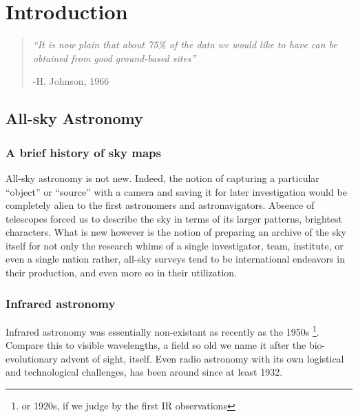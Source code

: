 \chapter{Introduction}
  \label{ch:intro}
  \begin{quotation}
    \small
    \textit{``It is now plain that about 75\% of the data we would like to have can be obtained from good ground-based sites''}

    -H. Johnson, 1966
  \end{quotation}

\section{All-sky Astronomy}

  \subsection{A brief history of sky maps}

    All-sky astronomy is not new. Indeed, the notion of capturing a particular ``object'' or ``source'' with a camera and saving it for later investigation would be completely alien to the first astronomers and astronavigators. Absence of telescopes forced us to describe the sky in terms of its larger patterns, brightest characters. What is new however is the notion of preparing an archive of the sky itself for not only the research whims of a single investigator, team, institute, or even a single nation\- rather, all-sky surveys tend to be international endeavors in their production, and even more so in their utilization.


  \subsection{Infrared astronomy}

  Infrared astronomy was essentially non-existant as recently as the 1950s \citep{johnson66} \footnote{or 1920s, if we judge by the first IR observations}. Compare this to visible wavelengths, a field so old we name it after the bio-evolutionary advent of sight, itself. Even radio astronomy with its own logistical and technological challenges, has been around since at least 1932.


